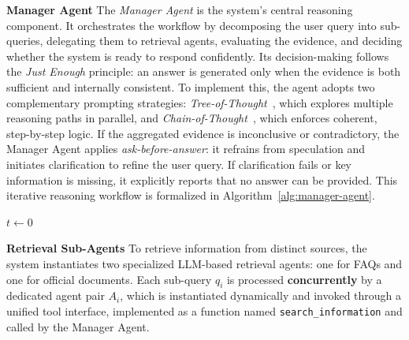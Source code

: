 \documentclass[11pt]{article}
\begin{document}
\smallskip
\noindent \textbf{Manager Agent} \quad
The \textit{Manager Agent} is the system’s central reasoning component. It orchestrates the workflow by decomposing the user query into sub-queries, delegating them to retrieval agents, evaluating the evidence, and deciding whether the system is ready to respond confidently. Its decision-making follows the \textit{Just Enough} principle: an answer is generated only when the evidence is both sufficient and internally consistent. To implement this, the agent adopts two complementary prompting strategies: \textit{Tree-of-Thought}~\cite{yao2023tree}, which explores multiple reasoning paths in parallel, and \textit{Chain-of-Thought}~\cite{wei2022chain}, which enforces coherent, step-by-step logic. If the aggregated evidence is inconclusive or contradictory, the Manager Agent applies \textit{ask-before-answer}: it refrains from speculation and initiates clarification to refine the user query. If clarification fails or key information is missing, it explicitly reports that no answer can be provided. This iterative reasoning workflow is formalized in Algorithm~\ref{alg:manager-agent}.




\begin{algorithm}[t]
\caption{Manager Agent Reasoning}
\label{alg:manager-agent}

$t \leftarrow 0$ \;
\end{algorithm}


\smallskip
\noindent \textbf{Retrieval Sub-Agents} \quad
To retrieve information from distinct sources, the system instantiates two specialized LLM-based retrieval agents: one for FAQs and one for official documents. Each sub-query $q_i$ is processed \textbf{concurrently} by a dedicated agent pair $A_i$, which is instantiated dynamically and invoked through a unified tool interface, implemented as a function named \texttt{search\_information} and called by the Manager Agent.
\end{document}
